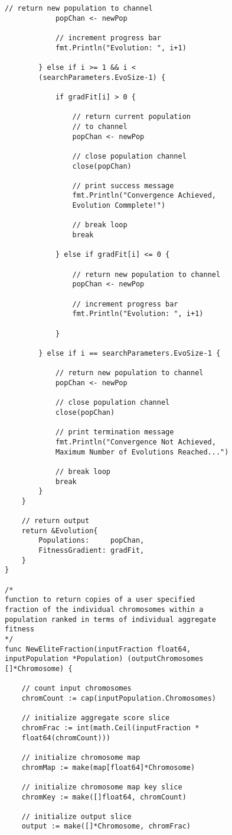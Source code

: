 \begin{lstlisting}[basicstyle=\small]
			// return new population to channel
			popChan <- newPop

			// increment progress bar
			fmt.Println("Evolution: ", i+1)

		} else if i >= 1 && i < 
		(searchParameters.EvoSize-1) {

			if gradFit[i] > 0 {

				// return current population  
				// to channel
				popChan <- newPop

				// close population channel
				close(popChan)

				// print success message
				fmt.Println("Convergence Achieved, 
				Evolution Commplete!")

				// break loop
				break

			} else if gradFit[i] <= 0 {

				// return new population to channel
				popChan <- newPop

				// increment progress bar
				fmt.Println("Evolution: ", i+1)

			}

		} else if i == searchParameters.EvoSize-1 {

			// return new population to channel
			popChan <- newPop

			// close population channel
			close(popChan)

			// print termination message
			fmt.Println("Convergence Not Achieved, 
			Maximum Number of Evolutions Reached...")

			// break loop
			break
		}
	}

	// return output
	return &Evolution{
		Populations:     popChan,
		FitnessGradient: gradFit,
	}
}

/* 
function to return copies of a user specified 
fraction of the individual chromosomes within a 
population ranked in terms of individual aggregate
fitness 
*/ 
func NewEliteFraction(inputFraction float64, 
inputPopulation *Population) (outputChromosomes 
[]*Chromosome) {

	// count input chromosomes
	chromCount := cap(inputPopulation.Chromosomes)

	// initialize aggregate score slice
	chromFrac := int(math.Ceil(inputFraction * 
	float64(chromCount)))

	// initialize chromosome map
	chromMap := make(map[float64]*Chromosome)

	// initialize chromosome map key slice
	chromKey := make([]float64, chromCount)

	// initialize output slice
	output := make([]*Chromosome, chromFrac)


\end{lstlisting}
